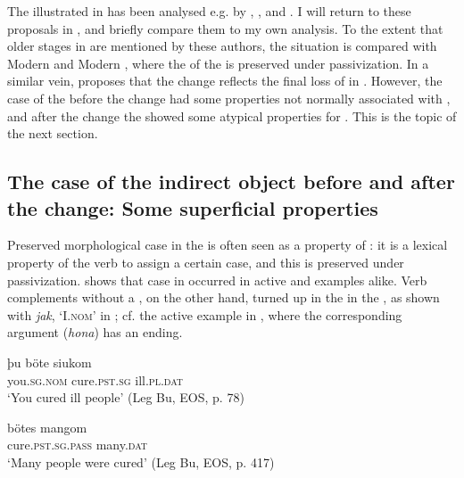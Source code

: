 \documentclass[output=paper]{langscibook}
\begin{document}
The  illustrated in  has been analysed e.g. by \citet{HolmbergPlatzack1995}, \citet{Platzack2005,Platzack2006}, and \citet{HaddicanHolmberg2019}. I will return to these proposals in , and briefly compare them to my own analysis. To the extent that older stages in  are mentioned by these authors, the situation is compared with Modern  and Modern , where the  of the  is preserved under passivization. In a similar vein, \citet{Falk1995, Falk1997} proposes that the change reflects the final loss of  in . However, the case of the  before the change had some properties not normally associated with , and after the change the  showed some atypical properties for . This is the topic of the next section.


\subsection{The case of the indirect object before and after the change: Some superficial properties}\label{sec:falk:2.2}


Preserved morphological case in the  is often seen as a property of : it is a lexical property of the verb to assign a certain case, and this is preserved under passivization.  shows that  case in  occurred in active  and   examples alike. Verb complements without a , on the other hand, turned up in the   in the , as shown with \textit{jak}, ‘I.\textsc{nom}’ in ; cf. the active example in , where the corresponding argument (\textit{hona}) has an  ending.

\ea%
    \label{ex:falk:3}
\ea\label{ex:falk:3a}
\gll þu              böte          siukom\\
      you.\textsc{sg.nom}  cure.\textsc{pst.sg}    ill.\textsc{pl}.\textsc{dat}\\
\glt ‘You cured ill people’ (Leg Bu, EOS, p. 78)

\ex\label{ex:falk:3b}
\gll bötes            mangom\\
      cure.\textsc{pst.sg.pass}  many.\textsc{dat}\\
\glt ‘Many people were cured’ (Leg Bu, EOS, p. 417)
\z
\ex%
    \label{ex:falk:4}
\end{document}
